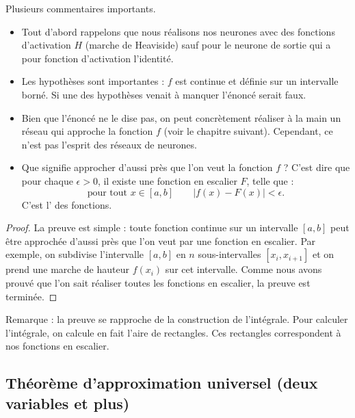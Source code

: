 \documentclass[11pt,class=report,crop=false]{standalone}
\begin{document}
Plusieurs commentaires importants.
\begin{itemize}
  \item Tout d'abord rappelons que nous réalisons nos neurones avec des fonctions d'activation $H$ (marche de Heaviside) sauf pour le neurone de sortie qui a pour fonction d'activation l'identité.
  
  \item Les hypothèses sont importantes : $f$ est continue et définie sur un intervalle borné. Si une des hypothèses venait à manquer l'énoncé serait faux.
  
  \item Bien que l'énoncé ne le dise pas, on peut concrètement réaliser à la main un réseau qui approche la fonction $f$ (voir le chapitre suivant). Cependant, ce n'est pas l'esprit des réseaux de neurones.
  
  \item Que signifie \og{}approcher d'aussi près que l'on veut la fonction $f$\fg{} ? C'est dire que pour chaque $\epsilon>0$, il existe une fonction en escalier $F$, telle que :
  $$\text{pour tout } x \in [a,b] \qquad | f(x)-F(x) | < \epsilon.$$
  C'est l' des fonctions.
  
\end{itemize}


\begin{proof}  
La preuve est simple : toute fonction continue sur un intervalle $[a,b]$ peut être approchée d'aussi près que l'on veut par une fonction en escalier. Par exemple, on subdivise l'intervalle $[a,b]$ en $n$ sous-intervalles $[x_i,x_{i+1}]$ et on prend une marche de hauteur $f(x_i)$ sur cet intervalle. Comme nous avons prouvé que l'on sait réaliser toutes les fonctions en escalier, la preuve est terminée.



\end{proof}
  
Remarque : la preuve se rapproche de la construction de l'intégrale. Pour calculer l'intégrale, on calcule en fait l'aire de rectangles. Ces rectangles correspondent à nos fonctions en escalier. 


\subsection{Théorème d'approximation universel (deux variables et plus)}
\end{document}
